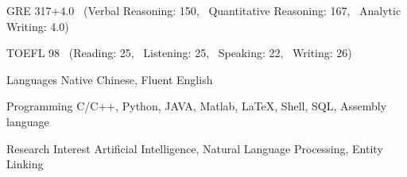 

\begin{cvskills}


  \cvskill
    {GRE} %
    {317+4.0 \ (Verbal Reasoning: 150, \ Quantitative Reasoning: 167, \ Analytic Writing: 4.0)} %
    
  \cvskill
    {TOEFL} %
    {98 \  (Reading: 25, \ Listening: 25, \ Speaking: 22, \ Writing: 26)} %

  \cvskill
    {Languages} %
    {Native Chinese, Fluent English} %


  \cvskill
    {Programming} %
    {C/C++, Python, JAVA, Matlab, LaTeX, Shell, SQL, Assembly language} %

  \cvskill
    {Research Interest} %
    {Artificial Intelligence, Natural Language Processing, Entity Linking} %

\end{cvskills}
